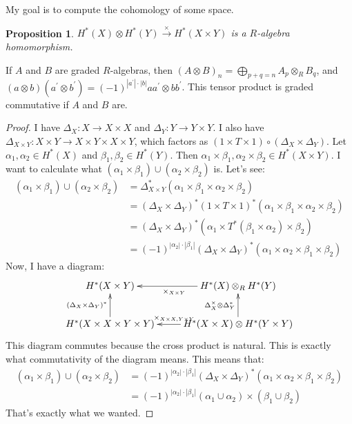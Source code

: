 \documentclass{amsart}
\theoremstyle{theorem}
\newtheorem{prop}[theorem]{Proposition}
\theoremstyle{definition}
\begin{document}
My goal is to compute the cohomology of some space.
\begin{prop}
$ H^\ast(X)\otimes H^\ast(Y)\xrightarrow{\times} H^\ast(X\times Y)$ is a $R$-algebra homomorphism.
\end{prop}
If $A$ and $B$ are graded $R$-algebras, then $(A\otimes B)_n=\bigoplus_{p+q=n}A_p\otimes_R B_q$, and $(a\otimes b)(a^\prime\otimes b^\prime)=(-1)^{|a^\prime|\cdot|b|}aa^\prime\otimes bb^\prime$. This tensor product is graded commutative if $A$ and $B$ are.
\begin{proof}
I have $\Delta_X:X\to X\times X$ and $\Delta_Y:Y\to Y\times Y$. I also have $\Delta_{X\times Y}:X\times Y\to X\times Y\times X\times Y$, which factors as $(1\times T\times 1)\circ(\Delta_X\times \Delta_Y)$. Let $\alpha_1,\alpha_2\in H^\ast(X)$ and $\beta_1,\beta_2\in H^\ast(Y)$. Then $\alpha_1\times \beta_1,\alpha_2\times\beta_2\in H^\ast(X\times Y)$. I want to calculate what $(\alpha_1\times\beta_1)\cup(\alpha_2\times\beta_2)$ is. Let's see:
\begin{align*}
(\alpha_1\times\beta_1)\cup(\alpha_2\times\beta_2) & = \Delta_{X\times Y}^\ast(\alpha_1\times\beta_1\times\alpha_2\times\beta_2)\\
& = (\Delta_X\times\Delta_Y)^\ast(1\times T\times 1)^\ast(\alpha_1\times\beta_1\times\alpha_2\times\beta_2)\\
& = (\Delta_X\times\Delta_Y)^\ast(\alpha_1\times T^\ast(\beta_1\times\alpha_2)\times\beta_2)\\
& = (-1)^{|\alpha_2|\cdot|\beta_1|}(\Delta_X\times\Delta_Y)^\ast(\alpha_1\times\alpha_2\times\beta_1\times\beta_2)
\end{align*}
Now, I have a diagram:
\begin{equation*}
\xymatrix{
	 H^\ast(X\times Y) & \ar[l]^{\times_{X\times Y}} H^\ast(X)\otimes_R H^\ast(Y)\\
	 H^\ast(X\times X\times Y\times Y)\ar[u]^{(\Delta_X\times\Delta_Y)^\ast} & H^\ast(X\times X)\otimes H^\ast(Y\times Y)\ar[l]_{\times_{X\times X,Y\times Y}}\ar[u]^{\Delta_X^\times\otimes\Delta_Y^\ast}
}
\end{equation*}
This diagram commutes because the cross product is natural. This is exactly what commutativity of the diagram means. This means that:
\begin{align*}
(\alpha_1\times\beta_1)\cup(\alpha_2\times\beta_2) & = (-1)^{|\alpha_2|\cdot|\beta_1|}(\Delta_X\times\Delta_Y)^\ast(\alpha_1\times\alpha_2\times\beta_1\times\beta_2)\\
& = (-1)^{|\alpha_2|\cdot|\beta_1|}(\alpha_1\cup\alpha_2)\times(\beta_1\cup\beta_2)
\end{align*}
That's exactly what we wanted.
\end{proof}
\end{document}

